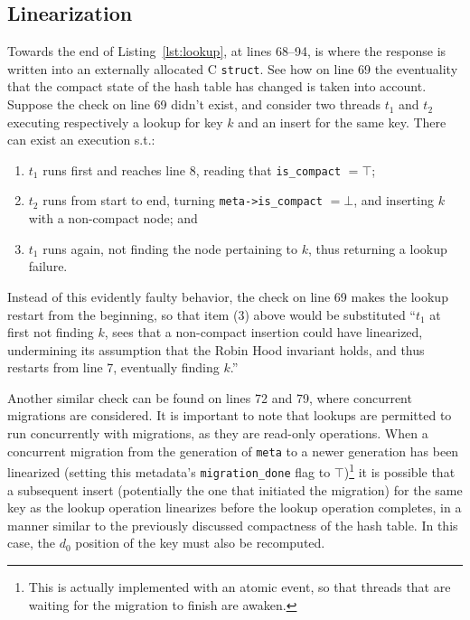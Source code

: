 

\subsection{Linearization}\label{subsec:lookup-linearization}

Towards the end of Listing~\ref{lst:lookup}, at lines 68--94, is where the response is written into an externally allocated C \texttt{struct}.
See how on line 69 the eventuality that the compact state of the hash table has changed is taken into account.
Suppose the check on line 69 didn't exist, and consider two threads $t_1$ and $t_2$ executing respectively a lookup for key $k$ and an insert for the same key.
There can exist an execution s.t.:
\begin{enumerate}
	\item $t_1$ runs first and reaches line 8, reading that \texttt{is\_compact} $= \top$;
	\item $t_2$ runs from start to end, turning \texttt{{meta->is\_compact}} $= \bot$, and inserting $k$ with a non-compact node; and
	\item $t_1$ runs again, not finding the node pertaining to $k$, thus returning a lookup failure.
\end{enumerate}

Instead of this evidently faulty behavior, the check on line 69 makes the lookup restart from the beginning, so that item (3) above would be substituted ``$t_1$ at first not finding $k$, sees that a non-compact insertion could have linearized, undermining its assumption that the Robin Hood invariant holds, and thus restarts from line 7, eventually finding $k$.''

Another similar check can be found on lines 72 and 79, where concurrent migrations are considered.
It is important to note that lookups are permitted to run concurrently with migrations, as they are read-only operations.
When a concurrent migration from the generation of \texttt{meta} to a newer generation has been linearized (setting this metadata's \texttt{{migration\_done}} flag to $\top$)\footnote{%
	This is actually implemented with an atomic event, so that threads that are waiting for the migration to finish are awaken.
} it is possible that a subsequent insert (potentially the one that initiated the migration) for the same key as the lookup operation linearizes before the lookup operation completes, in a manner similar to the previously discussed compactness of the hash table.
In this case, the $d_0$ position of the key must also be recomputed.

